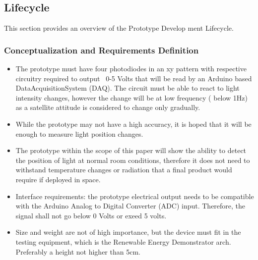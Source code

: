 \subsection{Lifecycle}
This section provides an overview of the Prototype Develop ment Lifecycle.

%         

\subsubsection*{Conceptualization and Requirements Definition}
\begin{itemize}
  \item The prototype must have four photodiodes in an xy pattern with respective circuitry required to output ~0-5 Volts that will be read by an Arduino based DataAcquisitionSystem (DAQ). The circuit must be able to react to light intensity changes, however the change will be at low frequency ( below 1Hz) as a satellite attitude is considered to change only gradually.
  \item While the prototype may not have a high accuracy, it is hoped that it will be enough to measure light position changes.  
  \item The prototype within the scope of this paper will show the ability to detect the position of light at normal room conditions, therefore it does not need to withstand temperature changes or radiation that a final product would require if deployed in space.
  \item Interface requirements: the prototype electrical output needs to be compatible with the Arduino Analog to Digital Converter (ADC) input. Therefore, the signal shall not go below 0 Volts or exeed 5 volts. 
  \item Size and weight are not of high importance, but the device must fit in the testing equipment, which is the Renewable Energy Demonstrator arch. Preferably a height not higher than 5cm.
\end{itemize}
